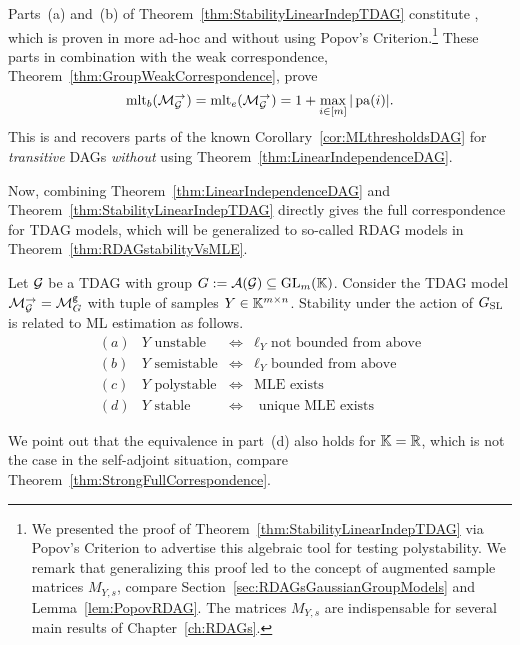 Parts~(a) and~(b) of Theorem~\ref{thm:StabilityLinearIndepTDAG} constitute \cite[Theorem~5.3]{SiagaPaper}, which is proven in \cite{SiagaPaper} more ad-hoc and without using Popov's Criterion.\footnote{We presented the proof of Theorem~\ref{thm:StabilityLinearIndepTDAG} via Popov's Criterion to advertise this algebraic tool for testing polystability. We remark that generalizing this proof led to the concept of augmented sample matrices $M_{Y,s}$, compare Section~\ref{sec:RDAGsGaussianGroupModels} and Lemma~\ref{lem:PopovRDAG}. The matrices $M_{Y,s}$ are indispensable for several main results of Chapter~\ref{ch:RDAGs}.}
These parts in combination with the weak correspondence, Theorem~\ref{thm:GroupWeakCorrespondence}, prove
	\[ \operatorname{mlt}_b(\mathcal{M}_{\mathcal{G}}^{\to}) = \operatorname{mlt}_e(\mathcal{M}_{\mathcal{G}}^{\to}) = 1 + \max_{i \in [m]} |\operatorname{pa}(i)| .\]
This is \cite[Corollary~5.5]{SiagaPaper} and recovers parts of the known Corollary~\ref{cor:MLthresholdsDAG} for \emph{transitive} DAGs \emph{without} using Theorem~\ref{thm:LinearIndependenceDAG}.

Now, combining Theorem~\ref{thm:LinearIndependenceDAG} and Theorem~\ref{thm:StabilityLinearIndepTDAG} directly gives the full correspondence for TDAG models, which will be generalized to so-called RDAG models in Theorem~\ref{thm:RDAGstabilityVsMLE}.

\begin{theorem} \label{thm:FullCorrespondenceTDAG}
	Let $\mathcal{G}$ be a TDAG with group $G := \mathcal{A}(\mathcal{G}) \subseteq \operatorname{GL}_m(\mathbb K)$. Consider the TDAG model $\mathcal{M}_{\mathcal{G}}^{\to} = \mathcal{M}^{\mathtt{g}}_G$ with tuple of samples $Y \in \mathbb K^{m \times n}$.
	Stability under the action of $G_{\operatorname{SL}}$ is related to ML estimation as follows.
	\[ \begin{matrix}
		(a) & Y \text{ unstable} & \Leftrightarrow & \ell_Y \text{ not bounded from above} \\
		(b) & Y \text{ semistable} & \Leftrightarrow & \ell_Y \text{  bounded from above} \\ 
		(c) & Y \text{ polystable} & \Leftrightarrow & \text{MLE exists}	\\
		(d) & Y \text{ stable} & \Leftrightarrow & \text{ unique MLE exists} 
	\end{matrix}\]
\end{theorem}

We point out that the equivalence in part~(d) also holds for $\mathbb K = \mathbb R$, which is not the case in the self-adjoint situation, compare Theorem~\ref{thm:StrongFullCorrespondence}.

